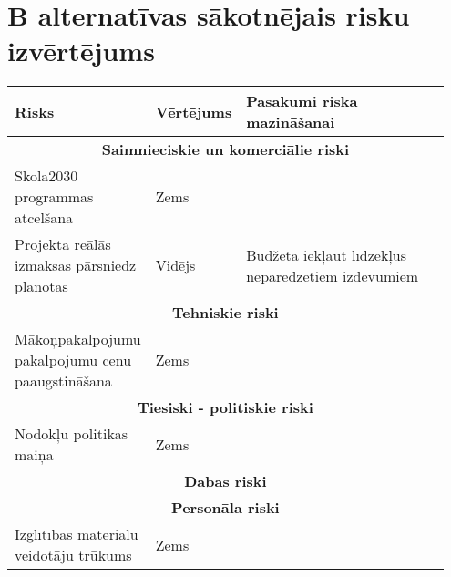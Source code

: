 \section{B alternatīvas sākotnējais risku izvērtējums}
\label{app:B_sakotnejie_riski}
\begin{table}[!ht]
    \centering
    \begin{tabular}{|p{0.3\linewidth}|p{0.15\linewidth}|p{0.5\linewidth}|}
        \hline
        \textbf{Risks} & \textbf{Vērtējums} & \textbf{Pasākumi riska mazināšanai} \\
        \hline
        \multicolumn{3}{|c|}{\textbf{Saimnieciskie un komerciālie riski}} \\
        \hline
        Skola2030 programmas atcelšana & Zems & \\
        \hline
        Projekta reālās izmaksas pārsniedz plānotās & Vidējs & Budžetā iekļaut līdzekļus neparedzētiem izdevumiem \\
        \hline
        \multicolumn{3}{|c|}{\textbf{Tehniskie riski}} \\
        \hline
        Mākoņpakalpojumu pakalpojumu cenu paaugstināšana & Zems & \\
        \hline
        \multicolumn{3}{|c|}{\textbf{Tiesiski - politiskie riski}} \\
        \hline
        Nodokļu politikas maiņa & Zems & \\
        \hline 
        \multicolumn{3}{|c|}{\textbf{Dabas riski}} \\
        \hline
        \multicolumn{3}{|c|}{\textbf{Personāla riski}} \\
        \hline
        Izglītības materiālu veidotāju trūkums & Zems & \\
        \hline
    \end{tabular}
\end{table}
\clearpage
